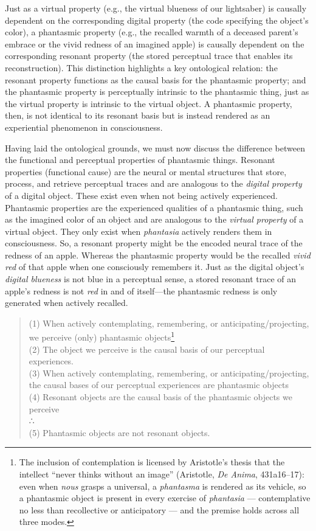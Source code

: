 \documentclass{article}
\begin{document}
Just as a virtual property (e.g., the virtual blueness of our lightsaber) is causally dependent on the corresponding digital property (the code specifying the object's color), a phantasmic property (e.g., the recalled warmth of a deceased parent's embrace or the vivid redness of an imagined apple) is causally dependent on the corresponding resonant property (the stored perceptual trace that enables its reconstruction). This distinction highlights a key ontological relation: the resonant property functions as the causal basis for the phantasmic property; and the phantasmic property is perceptually intrinsic to the phantasmic thing, just as the virtual property is intrinsic to the virtual object. A phantasmic property, then, is not identical to its resonant basis but is instead rendered as an experiential phenomenon in consciousness.

Having laid the ontological grounds, we must now discuss the difference between the functional and perceptual properties of phantasmic things. Resonant properties (functional cause) are the neural or mental structures that store, process, and retrieve perceptual traces and are analogous to the \textit{digital property} of a digital object. These exist even when not being actively experienced. Phantasmic properties are the experienced qualities of a phantasmic thing, such as the imagined color of an object and are analogous to the \textit{virtual property} of a virtual object. They only exist when \textit{phantasia} actively renders them in consciousness. So, a resonant property might be the encoded neural trace of the redness of an apple. Whereas the phantasmic property would be the recalled \textit{vivid red} of that apple when one consciously remembers it. Just as the digital object's \textit{digital blueness} is not blue in a perceptual sense, a stored resonant trace of an apple's redness is not \textit{red} in and of itself—the phantasmic redness is only generated when actively recalled.

\begin{quote}
(1) When actively contemplating, remembering, or anticipating/projecting, we perceive (only) phantasmic objects\footnote{The inclusion of contemplation is licensed by Aristotle's thesis that the intellect “never thinks without an image” (Aristotle, \textit{De Anima}, 431a16–17): even when \textit{nous} grasps a universal, a \textit{phantasma} is rendered as its vehicle, so a phantasmic object is present in every exercise of \textit{phantasia} — contemplative no less than recollective or anticipatory — and the premise holds across all three modes.} \\
(2) The object we perceive is the causal basis of our perceptual experiences. \\
(3) When actively contemplating, remembering, or anticipating/projecting, the causal bases of our perceptual experiences are phantasmic objects \\
(4) Resonant objects are the causal basis of the phantasmic objects we perceive \\
∴ \\
(5) Phantasmic objects are not resonant objects.
\end{quote}
\end{document}
